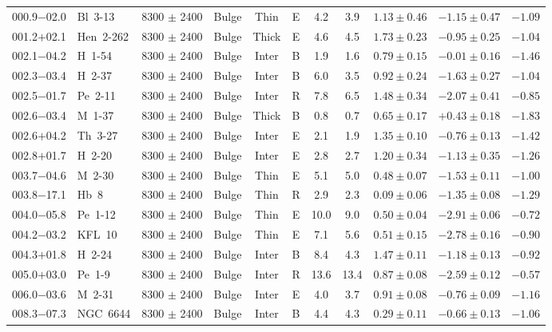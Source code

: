 \documentclass[useAMS]{mn2e}
\begin{document}
\begin{center}
{\begin{longtable}{llccccccccc}
000.9$-$02.0		&	Bl~3-13	&	8300 $\pm$ 2400		&	Bulge		&	Thin		&	E		&	4.2		&	3.9		&	$1.13 \pm 0.46$		&	$-1.15 \pm 0.47$		&	$-1.09$	\\
001.2$+$02.1		&	Hen~2-262	&	8300 $\pm$ 2400		&	Bulge		&	Thick		&	E		&	4.6		&	4.5		&	$1.73 \pm 0.23$		&	$-0.95 \pm 0.25$		&	$-1.04$	\\
002.1$-$04.2		&	H~1-54	&	8300 $\pm$ 2400		&	Bulge		&	Inter		&	B		&	1.9		&	1.6		&	$0.79 \pm 0.15$		&	$-0.01 \pm 0.16$		&	$-1.46$	\\
002.3$-$03.4		&	H~2-37	&	8300 $\pm$ 2400		&	Bulge		&	Inter		&	B		&	6.0		&	3.5		&	$0.92 \pm 0.24$		&	$-1.63 \pm 0.27$		&	$-1.04$	\\
002.5$-$01.7		&	Pe~2-11	&	8300 $\pm$ 2400		&	Bulge		&	Inter		&	R		&	7.8		&	6.5		&	$1.48 \pm 0.34$		&	$-2.07 \pm 0.41$		&	$-0.85$	\\
002.6$-$03.4		&	M~1-37	&	8300 $\pm$ 2400		&	Bulge		&	Thick		&	B		&	0.8		&	0.7		&	$0.65 \pm 0.17$		&	$+0.43 \pm 0.18$		&	$-1.83$	\\
002.6$+$04.2		&	Th~3-27	&	8300 $\pm$ 2400		&	Bulge		&	Inter		&	E		&	2.1		&	1.9		&	$1.35 \pm 0.10$		&	$-0.76 \pm 0.13$		&	$-1.42$	\\
002.8$+$01.7		&	H~2-20	&	8300 $\pm$ 2400		&	Bulge		&	Inter		&	E		&	2.8		&	2.7		&	$1.20 \pm 0.34$		&	$-1.13 \pm 0.35$		&	$-1.26$	\\
003.7$-$04.6		&	M~2-30	&	8300 $\pm$ 2400		&	Bulge		&	Thin		&	E		&	5.1		&	5.0		&	$0.48 \pm 0.07$		&	$-1.53 \pm 0.11$		&	$-1.00$	\\
003.8$-$17.1		&	Hb~8	&	8300 $\pm$ 2400		&	Bulge		&	Thin		&	R		&	2.9		&	2.3		&	$0.09 \pm 0.06$		&	$-1.35 \pm 0.08$		&	$-1.29$	\\
004.0$-$05.8		&	Pe~1-12	&	8300 $\pm$ 2400		&	Bulge		&	Thin		&	E		&	10.0		&	9.0		&	$0.50 \pm 0.04$		&	$-2.91 \pm 0.06$		&	$-0.72$	\\
004.2$-$03.2		&	KFL~10	&	8300 $\pm$ 2400		&	Bulge		&	Thin		&	E		&	7.1		&	5.6		&	$0.51 \pm 0.15$		&	$-2.78 \pm 0.16$		&	$-0.90$	\\
004.3$+$01.8		&	H~2-24	&	8300 $\pm$ 2400		&	Bulge		&	Inter		&	B		&	8.4		&	4.3		&	$1.47 \pm 0.11$		&	$-1.18 \pm 0.13$		&	$-0.92$	\\
005.0$+$03.0		&	Pe~1-9	&	8300 $\pm$ 2400		&	Bulge		&	Inter		&	R		&	13.6		&	13.4		&	$0.87 \pm 0.08$		&	$-2.59 \pm 0.12$		&	$-0.57$	\\
006.0$-$03.6		&	M~2-31	&	8300 $\pm$ 2400		&	Bulge		&	Inter		&	E		&	4.0		&	3.7		&	$0.91 \pm 0.08$		&	$-0.76 \pm 0.09$		&	$-1.16$	\\
008.3$-$07.3		&	NGC~6644	&	8300 $\pm$ 2400		&	Bulge		&	Inter		&	B		&	4.4		&	4.3		&	$0.29 \pm 0.11$		&	$-0.66 \pm 0.13$		&	$-1.06$	\\

\end{longtable}}
\end{center}
\end{document}
